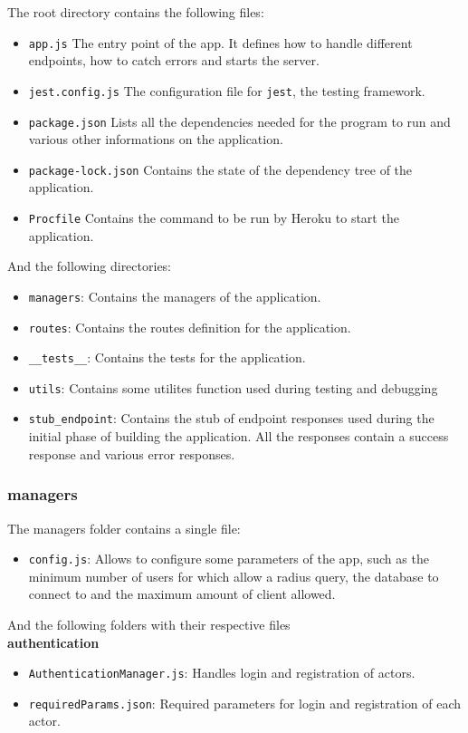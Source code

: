 The root directory contains the following files: 
\begin{itemize}
    \item \texttt{app.js} The entry point of the app. It defines how to handle different endpoints, how to catch errors and starts the server.
    \item \texttt{jest.config.js} The configuration file for \texttt{jest}, the testing framework.
    \item \texttt{package.json} Lists all the dependencies needed for the program to run and various other informations on the application.
    \item \texttt{package-lock.json} Contains the state of the dependency tree of the application.
    \item  \texttt{Procfile} Contains the command to be run by Heroku to start the application.
\end{itemize}
And the following directories: 
\begin{itemize}
    \item \texttt{managers}: Contains the managers of the application.
    \item \texttt{routes}: Contains the routes definition for the application.
    \item \texttt{\_\_tests\_\_}: Contains the tests for the application. 
    \item \texttt{utils}: Contains some utilites function used during testing and debugging
    \item \texttt{stub\_endpoint}: Contains the stub of endpoint responses used during the initial phase of building the application.
    All the responses contain a success response and various error responses.
\end{itemize}

\subsubsection{managers}
The managers folder contains a single file: 
\begin{itemize}
    \item \texttt{config.js}: Allows to configure some parameters of the app, such as the minimum number of users for which allow a radius query, the database to connect to and the maximum amount of client allowed.
\end{itemize}

And the following folders with their respective files \\
\noindent \textbf{authentication}
\begin{itemize}
    \item \texttt{AuthenticationManager.js}: Handles login and registration of actors.
    \item \texttt{requiredParams.json}: Required parameters for login and registration of each actor.
\end{itemize}

